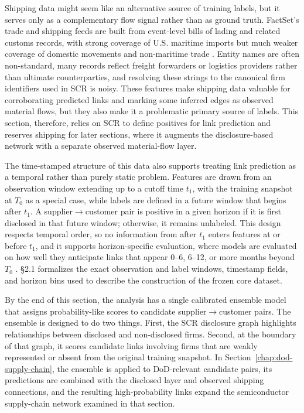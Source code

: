 Shipping data might seem like an alternative source of training labels, but it serves only as a complementary flow signal rather than as ground truth. FactSet's trade and shipping feeds are built from event-level bills of lading and related customs records, with strong coverage of U.S. maritime imports but much weaker coverage of domestic movements and non-maritime trade \parencite{factset_factset_2021, factset_factset_2025}. Entity names are often non-standard, many records reflect freight forwarders or logistics providers rather than ultimate counterparties, and resolving these strings to the canonical firm identifiers used in SCR is noisy. These features make shipping data valuable for corroborating predicted links and marking some inferred edges as observed material flows, but they also make it a problematic primary source of labels. This section, therefore, relies on SCR to define positives for link prediction and reserves shipping for later sections, where it augments the disclosure-based network with a separate observed material-flow layer.

The time-stamped structure of this data also supports treating link prediction as a temporal rather than purely static problem. Features are drawn from an observation window extending up to a cutoff time $t_1$, with the training snapshot at $T_0$ as a special case, while labels are defined in a future window that begins after $t_1$. A supplier$\rightarrow$customer pair is positive in a given horizon if it is first disclosed in that future window; otherwise, it remains unlabeled. This design respects temporal order, so no information from after $t_1$ enters features at or before $t_1$, and it supports horizon-specific evaluation, where models are evaluated on how well they anticipate links that appear 0--6, 6--12, or more months beyond $T_0$ \parencite{holme_temporal_2012}. \S2.1 formalizes the exact observation and label windows, timestamp fields, and horizon bins used to describe the construction of the frozen core dataset.

By the end of this section, the analysis has a single calibrated ensemble model that assigns probability-like scores to candidate supplier$\rightarrow$customer pairs. The ensemble is designed to do two things. First, the SCR disclosure graph highlights relationships between disclosed and non-disclosed firms. Second, at the boundary of that graph, it scores candidate links involving firms that are weakly represented or absent from the original training snapshot. In Section~\ref{chap:dod-supply-chain}, the ensemble is applied to DoD-relevant candidate pairs, its predictions are combined with the disclosed layer and observed shipping connections, and the resulting high-probability links expand the semiconductor supply-chain network examined in that section.

